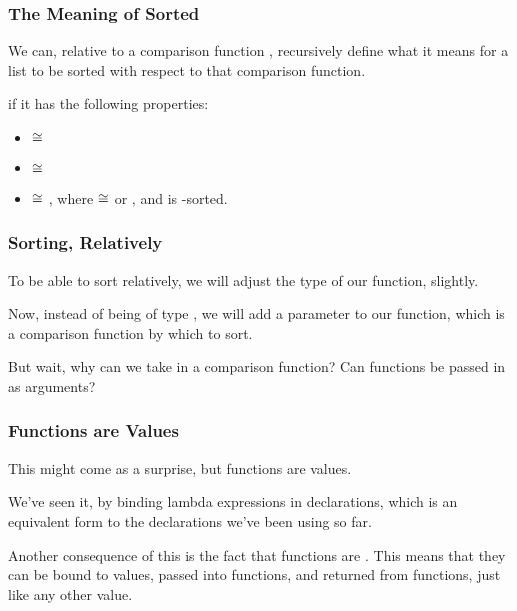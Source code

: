 \documentclass[aspectratio=169, handout]{beamer}
\begin{document}
\begin{frame}[fragile]
  \frametitle{The Meaning of Sorted}

  \rprs

  We can, relative to a comparison function , recursively
  define what it means for a list to be sorted with respect to that comparison
  function.

  \pause
  \vspace{\fill}

   if
  it has the following properties:

  \pause
  \begin{itemize}
    \item {} $\cong$ \code{[]}
    \item {} $\cong$ \code{[x]}
    \item {} $\cong$ , where  $\cong$ 
     or , and  is -sorted.
  \end{itemize}
\end{frame}

\begin{frame}[fragile]
  \frametitle{Sorting, Relatively}

  To be able to sort relatively, we will adjust the type of our 
  function, slightly.

  \pause
  \vspace{\fill}

  Now, instead of being of type , we will add a parameter
  to our  function, which is a comparison function by which to sort. 

  \pause
  \vspace{\fill}

  But wait, why can we take in a comparison function? Can functions be passed in as arguments?
\end{frame}

\begin{frame}[fragile]
  \frametitle{Functions are Values}

  This might come as a surprise\footnotemark, but functions are values.

  \pause
  \vspace{\fill}

  We've seen it, by binding lambda expressions in  declarations, which 
  is an equivalent form to the  declarations we've been using so far.

  \pause
  \vspace{\fill}

  Another consequence of this is the fact that functions are .
  This means that they can be bound to values, passed into functions, and returned
  from functions, just like any other value. 

\end{frame}
\end{document}

